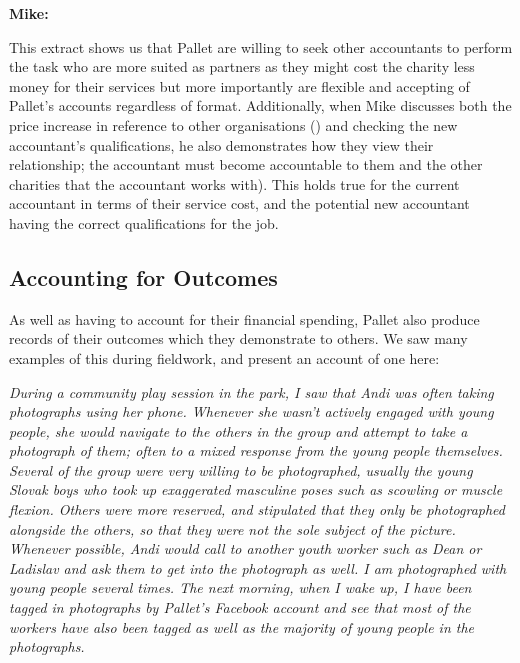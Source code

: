 \textbf{Mike:} 

This extract shows us that Pallet are willing to seek other accountants to perform the task who are more suited as partners as they might cost the charity less money for their services but more importantly are flexible and accepting of Pallet's accounts regardless of format. Additionally, when Mike discusses both the price increase in reference to other organisations () and checking the new accountant's qualifications, he also demonstrates how they view their relationship; the accountant must become accountable to them and the other charities that the accountant works with). This holds true for the current accountant in terms of their service cost, and the potential new accountant having the correct qualifications for the job.

\subsection{Accounting for Outcomes}
As well as having to account for their financial spending, Pallet also produce records of their outcomes which they demonstrate to others. We saw many examples of this during fieldwork, and present an account of one here:

\textit{During a community play session in the park, I saw that Andi was often taking photographs using her phone. Whenever she wasn't actively engaged with young people, she would navigate to the others in the group and attempt to take a photograph of them; often to a mixed response from the young people themselves. Several of the group were very willing to be photographed, usually the young Slovak boys who took up exaggerated masculine poses such as scowling or muscle flexion. Others were more reserved, and stipulated that they only be photographed alongside the others, so that they were not the sole subject of the picture. Whenever possible, Andi would call to another youth worker such as Dean or Ladislav and ask them to get into the photograph as well. I am photographed with young people several times. The next morning, when I wake up, I have been tagged in photographs by Pallet's Facebook account and see that most of the workers have also been tagged as well as the majority of young people in the photographs.}


